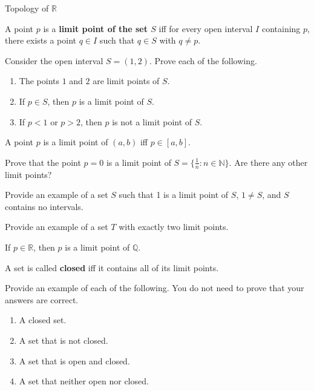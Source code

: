 \begin{section}{Topology of $\mathbb{R}$}
\begin{definition}
A point $p$ is a \textbf{limit point of the set $S$} iff for every open interval $I$ containing $p$, there exists a point $q \in I$ such that $q \in S$ with $q\neq p$.
\end{definition}

\begin{problem}
Consider the open interval $S=(1,2)$. Prove each of the following.
\begin{enumerate}
\item The points $1$ and $2$ are limit points of $S$.
\item If $p\in S$, then $p$ is a limit point of $S$.
\item If $p<1$ or $p>2$, then $p$ is not a limit point of $S$.
\end{enumerate}
\end{problem}

\begin{theorem}
A point $p$ is a limit point of $(a,b)$ iff $p\in [a,b]$.
\end{theorem}

\begin{problem}
Prove that the point $p=0$ is a limit point of $S=\{\frac{1}{n}: n \in \mathbb{N}\}$.  Are there any other limit points?
\end{problem}

\begin{exercise}
Provide an example of a set $S$ such that 1 is a limit point of $S$, $1\neq S$, and $S$ contains no intervals.
\end{exercise}

\begin{exercise}
Provide an example of a set $T$ with exactly two limit points.
\end{exercise}

\begin{theorem}
If $p\in\mathbb{R}$, then $p$ is a limit point of $\mathbb{Q}$.
\end{theorem}

\begin{definition}
A set is called \textbf{closed} iff it contains all of its limit points.
\end{definition}

\begin{exercise}
Provide an example of each of the following.  You do not need to prove that your answers are correct.
\begin{enumerate}
\item A closed set.
\item A set that is not closed.
\item A set that is open and closed.
\item A set that neither open nor closed.
\end{enumerate}


\end{exercise}
\end{section}
